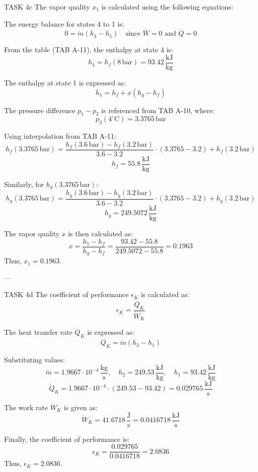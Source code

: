 TASK 4c  
The vapor quality \( x_1 \) is calculated using the following equations:  

The energy balance for states 4 to 1 is:  
\[
0 = \dot{m}(h_4 - h_1) \quad \text{since } \dot{W} = 0 \text{ and } \dot{Q} = 0
\]  

From the table (TAB A-11), the enthalpy at state 4 is:  
\[
h_4 = h_f(8 \, \text{bar}) = 93.42 \, \frac{\text{kJ}}{\text{kg}}
\]  

The enthalpy at state 1 is expressed as:  
\[
h_1 = h_f + x(h_g - h_f)
\]  

The pressure difference \( p_1 - p_2 \) is referenced from TAB A-10, where:  
\[
p_2(4^\circ\text{C}) = 3.3765 \, \text{bar}
\]  

Using interpolation from TAB A-11:  
\[
h_f(3.3765 \, \text{bar}) = \frac{h_f(3.6 \, \text{bar}) - h_f(3.2 \, \text{bar})}{3.6 - 3.2} \cdot (3.3765 - 3.2) + h_f(3.2 \, \text{bar})
\]  
\[
h_f = 55.8 \, \frac{\text{kJ}}{\text{kg}}
\]  

Similarly, for \( h_g(3.3765 \, \text{bar}) \):  
\[
h_g(3.3765 \, \text{bar}) = \frac{h_g(3.6 \, \text{bar}) - h_g(3.2 \, \text{bar})}{3.6 - 3.2} \cdot (3.3765 - 3.2) + h_g(3.2 \, \text{bar})
\]  
\[
h_g = 249.5072 \, \frac{\text{kJ}}{\text{kg}}
\]  

The vapor quality \( x \) is then calculated as:  
\[
x = \frac{h_1 - h_f}{h_g - h_f} = \frac{93.42 - 55.8}{249.5072 - 55.8} = 0.1963
\]  
Thus, \( x_1 = 0.1963 \).  

---

TASK 4d  
The coefficient of performance \( \epsilon_K \) is calculated as:  
\[
\epsilon_K = \frac{\dot{Q}_K}{\dot{W}_K}
\]  

The heat transfer rate \( \dot{Q}_K \) is expressed as:  
\[
\dot{Q}_K = \dot{m}(h_2 - h_1)
\]  

Substituting values:  
\[
\dot{m} = 1.9667 \cdot 10^{-4} \, \frac{\text{kg}}{\text{s}}, \quad h_2 = 249.53 \, \frac{\text{kJ}}{\text{kg}}, \quad h_1 = 93.42 \, \frac{\text{kJ}}{\text{kg}}
\]  
\[
\dot{Q}_K = 1.9667 \cdot 10^{-4} \cdot (249.53 - 93.42) = 0.029765 \, \frac{\text{kJ}}{\text{s}}
\]  

The work rate \( \dot{W}_K \) is given as:  
\[
\dot{W}_K = 41.6718 \, \frac{\text{J}}{\text{s}} = 0.0416718 \, \frac{\text{kJ}}{\text{s}}
\]  

Finally, the coefficient of performance is:  
\[
\epsilon_K = \frac{0.029765}{0.0416718} = 2.0836
\]  
Thus, \( \epsilon_K = 2.0836 \).  